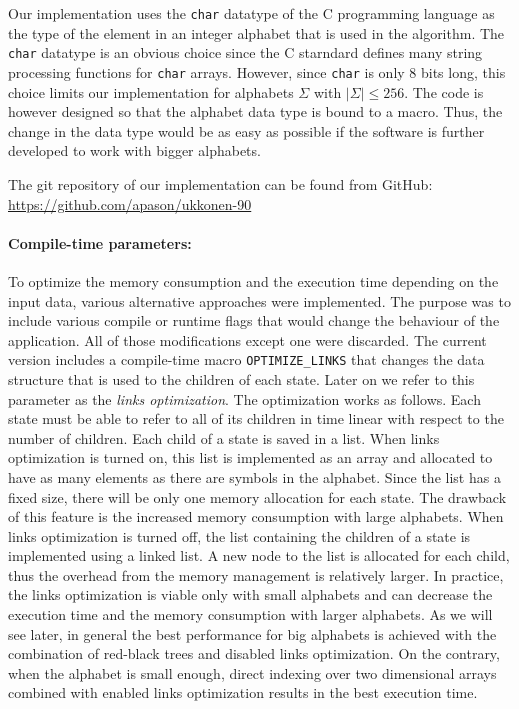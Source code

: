 \documentclass[english,twoside,censored,csm,algorithms-track-2020]{HYthesisML}
\theoremstyle{plain}
\theoremstyle{definition}
\numberwithin{testexample}{chapter}
\begin{document}
Our implementation uses the \texttt{char} datatype of the C programming language as the
type of the element
in an integer alphabet that is used in the algorithm. The \texttt{char} datatype is an obvious
choice since the C starndard defines many string processing functions for \texttt{char} arrays.
However, since \texttt{char} is only 8 bits long, this choice limits our implementation for alphabets
$\Sigma$ with $|\Sigma| \leq 256$. The code is however designed so that the alphabet data type
is bound to a macro. Thus, the change in the
data type would be as easy as possible if the software is further developed to work with
bigger alphabets. 

The git repository of our implementation can be found from GitHub:\\ \url{https://github.com/apason/ukkonen-90}

\paragraph{Compile-time parameters:}
To optimize the memory consumption and the execution time depending on the input data,
various alternative approaches were implemented.
The purpose was to include various compile or runtime flags that would change the behaviour
of the application. All of those modifications except one were discarded. The current version includes
a compile-time macro \texttt{OPTIMIZE\_LINKS} that changes the data structure that is used to the children of each
state. Later on we refer to this parameter as the {\em links optimization}. The optimization works as follows.
Each state must be able to refer to all of its children in time linear with respect to the number
of children.
Each child of a state is saved in a list. When links optimization is turned on, this list is
implemented as an array and allocated
to have as many elements as there are symbols in the alphabet. Since the list has a fixed size, there
will be only one memory allocation for each state. The drawback of this feature is the increased memory
consumption with large alphabets. When links optimization is turned off, the list containing the
children of a state is implemented using a linked list. A new node to the list is allocated for each
child, thus the overhead from the memory management is relatively larger. In practice, the links
optimization is viable only with small alphabets and can decrease the execution time and the memory
consumption with larger alphabets. As we will see later, in general the best performance for big
alphabets
is achieved with the combination of red-black trees and disabled links optimization. On the contrary,
when the alphabet is small enough, direct indexing over two dimensional arrays combined with
enabled links
optimization results in the best execution time.
\end{document}
